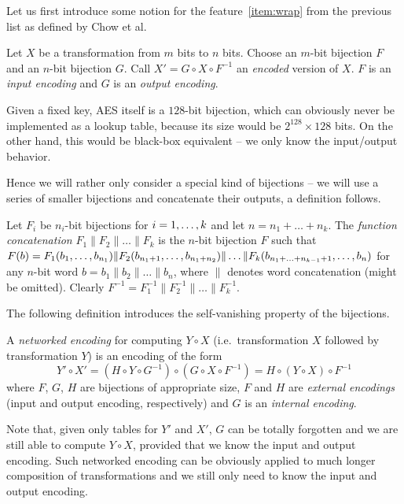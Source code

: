 Let us first introduce some notion for the feature~\ref{item:wrap} from the previous list as defined by Chow et al.

\begin{defn}[Encoding]
	Let $X$ be a transformation from $m$ bits to $n$ bits. Choose an $m$-bit bijection $F$ and an $n$-bit bijection $G$. Call $X' = G \circ X \circ F^{-1}$ an {\em encoded} version of $X$. $F$ is an {\em input encoding} and $G$ is an {\em output encoding}.
\end{defn}

\begin{note}
	Given a fixed key, AES itself is a $128$-bit bijection, which can obviously never be implemented as a lookup table, because its size would be $2^{128}\times 128$ bits. On the other hand, this would be black-box equivalent -- we only know the input/output behavior.
	
	Hence we will rather only consider a special kind of bijections -- we will use a series of smaller bijections and concatenate their outputs, a definition follows.
\end{note}

\begin{defn}
\label{def:concat}
	Let $F_i$ be $n_i$-bit bijections for $i=1 , \ldots , k$ and let $n = n_1 + \ldots + n_k$. The {\em function concatenation} $F_1 \| F_2 \| \ldots \| F_k$ is the $n$-bit bijection $F$ such that $F(b) = F_1(b_1 , \ldots , b_{n_1})\| F_2(b_{n_1+1} , \ldots , b_{n_1+n_2})\|\ldots\| F_k(b_{n_1+\ldots+n_{k-1}+1} , \ldots , b_n)$ for any $n$-bit word $b=b_1\|b_2\|\ldots\|b_n$, where $\|$ denotes word concatenation (might be omitted). Clearly $F^{-1} = F_1^{-1}\| F_2^{-1}\| \ldots \|F_k^{-1}$.
\end{defn}

The following definition introduces the self-vanishing property of the bijections.

\begin{defn}
\label{def:netw}
	A {\em networked encoding} for computing $Y\circ X$ (i.e.\ transformation $X$ followed by transformation $Y$) is an encoding of the form
	\[
		Y'\circ X' = (H\circ Y\circ G^{-1})\circ(G\circ X\circ F^{-1}) = H\circ(Y\circ X)\circ F^{-1}
	\]
	where $F$, $G$, $H$ are bijections of appropriate size, $F$ and $H$ are {\em external encodings} (input and output encoding, respectively) and $G$ is an {\em internal encoding}.
\end{defn}

Note that, given only tables for $Y'$ and $X'$, $G$ can be totally forgotten and we are still able to compute $Y\circ X$, provided that we know the input and output encoding. Such networked encoding can be obviously applied to much longer composition of transformations and we still only need to know the input and output encoding.


